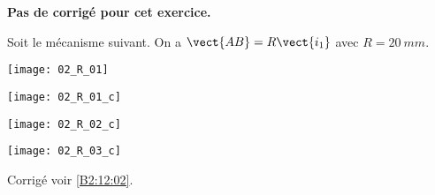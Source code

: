 \normaltrue
\correctiontrue


\setcounter{numques}{0}
\ifcorrection
\else
\textbf{Pas de corrigé pour cet exercice.}
\fi

\ifprof
\else
Soit le mécanisme suivant. On a $\vect{AB}=R\vect{i_1}$ avec $R=\SI{20}{mm}$. 
\begin{center}
\texttt{[image: 02\_R\_01]}
\end{center}
\fi

\ifprof
\begin{multicols}{3}
\else
\fi
{}
\ifprof
\begin{center}
\texttt{[image: 02\_R\_01\_c]}
\end{center}
\vfill\null
\columnbreak
\else
\fi

\ifprof
\begin{center}
\texttt{[image: 02\_R\_02\_c]}
\end{center}
\vfill\null
\columnbreak
\else
\fi

\ifprof
\begin{center}
\texttt{[image: 02\_R\_03\_c]}
\end{center}
\else
\fi



\ifprof
\end{multicols}
\else
\fi

\ifprof
\else
\begin{flushright}
\footnotesize{Corrigé  voir \ref{B2:12:02}.}
\end{flushright}%
\fi